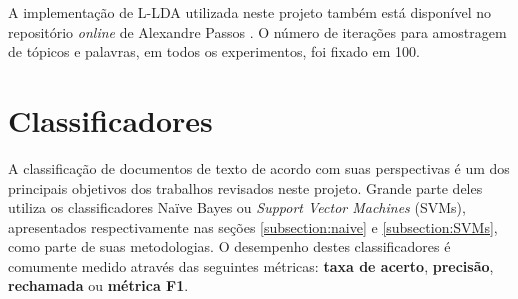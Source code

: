 A implementação de L-LDA utilizada neste projeto também está disponível no repositório \emph{online} de Alexandre Passos \cite{top-llda}. O número de iterações para amostragem de tópicos e palavras, em todos os experimentos, foi fixado em 100.








\section{Classificadores}

A classificação de documentos de texto de acordo com suas perspectivas é um dos principais objetivos dos trabalhos revisados neste projeto. Grande parte deles utiliza os classificadores Naïve Bayes ou \emph{Support Vector Machines} (SVMs), apresentados respectivamente nas seções \ref{subsection:naive} e \ref{subsection:SVMs}, como parte de suas metodologias. O desempenho destes classificadores é comumente medido através das seguintes métricas: \textbf{taxa de acerto}, \textbf{precisão}, \textbf{rechamada} ou \textbf{métrica F1}.

